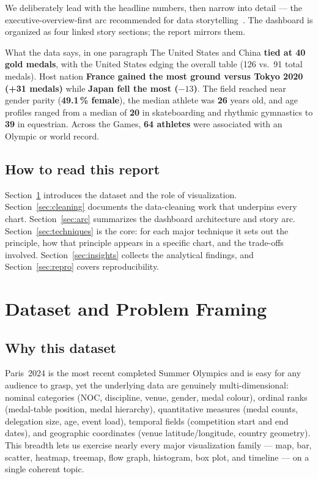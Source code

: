 \documentclass[11pt]{article}
\begin{document}
We deliberately lead with the headline numbers, then narrow into detail --- the
executive-overview-first arc recommended for data storytelling~\cite{bigbook2017}.
The dashboard is organized as four linked story sections; the report mirrors them.

\begin{insightbox}{What the data says, in one paragraph}
The United States and China \textbf{tied at 40 gold medals}, with the United
States edging the overall table (126 vs.\ 91 total medals). Host nation
\textbf{France gained the most ground versus Tokyo 2020 (+31 medals)} while
\textbf{Japan fell the most ($-13$)}. The field reached near gender parity
(\textbf{49.1\,\% female}), the median athlete was \textbf{26} years old, and
age profiles ranged from a median of \textbf{20} in skateboarding and rhythmic
gymnastics to \textbf{39} in equestrian. Across the Games, \textbf{64 athletes}
were associated with an Olympic or world record.
\end{insightbox}

\subsection*{How to read this report}
Section~\ref{sec:dataset} introduces the dataset and the role of visualization.
Section~\ref{sec:cleaning} documents the data-cleaning work that underpins every
chart. Section~\ref{sec:arc} summarizes the dashboard architecture and story arc.
Section~\ref{sec:techniques} is the core: for each major technique it sets out the
principle, how that principle appears in a specific chart, and the trade-offs
involved. Section~\ref{sec:insights} collects the analytical findings, and
Section~\ref{sec:repro} covers reproducibility.

\section{Dataset and Problem Framing}
\label{sec:dataset}

\subsection{Why this dataset}
Paris~2024 is the most recent completed Summer Olympics and is easy for any
audience to grasp, yet the underlying data are genuinely multi-dimensional:
nominal categories (NOC, discipline, venue, gender, medal colour), ordinal
ranks (medal-table position, medal hierarchy), quantitative measures (medal
counts, delegation size, age, event load), temporal fields (competition start
and end dates), and geographic coordinates (venue latitude/longitude, country
geometry). This breadth lets us exercise nearly every major visualization family
--- map, bar, scatter, heatmap, treemap, flow graph, histogram, box plot, and
timeline --- on a single coherent topic.
\end{document}
